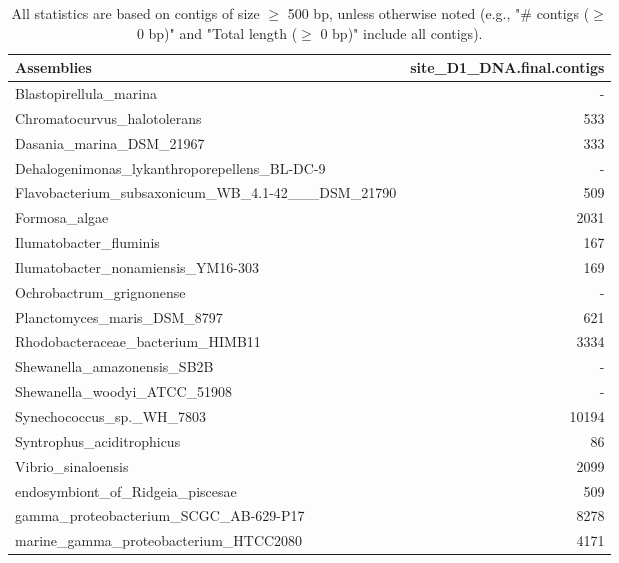 \documentclass[12pt,a4paper]{article}
\begin{document}
\begin{table}[ht]
\begin{center}
\caption{All statistics are based on contigs of size $\geq$ 500 bp, unless otherwise noted (e.g., "\# contigs ($\geq$ 0 bp)" and "Total length ($\geq$ 0 bp)" include all contigs).}
\begin{tabular}{|l*{1}{|r}|}
\hline
Assemblies & site\_D1\_DNA.final.contigs \\ \hline
Blastopirellula\_marina & - \\ \hline
Chromatocurvus\_halotolerans & 533 \\ \hline
Dasania\_marina\_DSM\_21967 & 333 \\ \hline
Dehalogenimonas\_lykanthroporepellens\_BL-DC-9 & - \\ \hline
Flavobacterium\_subsaxonicum\_WB\_4.1-42\_\_\_DSM\_21790 & 509 \\ \hline
Formosa\_algae & 2031 \\ \hline
Ilumatobacter\_fluminis & 167 \\ \hline
Ilumatobacter\_nonamiensis\_YM16-303 & 169 \\ \hline
Ochrobactrum\_grignonense & - \\ \hline
Planctomyces\_maris\_DSM\_8797 & 621 \\ \hline
Rhodobacteraceae\_bacterium\_HIMB11 & 3334 \\ \hline
Shewanella\_amazonensis\_SB2B & - \\ \hline
Shewanella\_woodyi\_ATCC\_51908 & - \\ \hline
Synechococcus\_sp.\_WH\_7803 & 10194 \\ \hline
Syntrophus\_aciditrophicus & 86 \\ \hline
Vibrio\_sinaloensis & 2099 \\ \hline
endosymbiont\_of\_Ridgeia\_piscesae & 509 \\ \hline
gamma\_proteobacterium\_SCGC\_AB-629-P17 & 8278 \\ \hline
marine\_gamma\_proteobacterium\_HTCC2080 & 4171 \\ \hline
\end{tabular}
\end{center}
\end{table}
\end{document}
